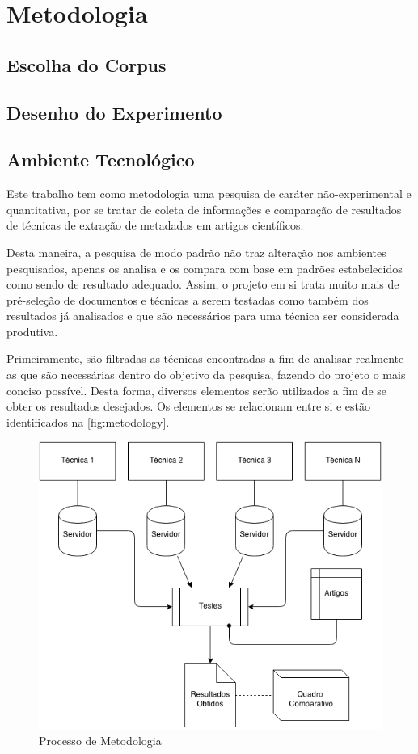 \chapter{Metodologia}

\section{Escolha do Corpus}

\section{Desenho do Experimento}

\section{Ambiente Tecnológico}

Este trabalho tem como metodologia uma pesquisa de caráter não-experimental e quantitativa, por se tratar de coleta de informações e comparação de resultados de técnicas de extração de metadados em artigos científicos.

Desta maneira, a pesquisa de modo padrão não traz alteração nos ambientes pesquisados, apenas os analisa e os compara com base em padrões estabelecidos como sendo de resultado adequado. Assim, o projeto em si trata muito mais de pré-seleção de documentos e técnicas a serem testadas como também dos resultados já analisados e que são necessários para uma técnica ser considerada produtiva.


Primeiramente, são filtradas as técnicas encontradas a fim de analisar realmente as que são necessárias dentro do objetivo da pesquisa, fazendo do projeto o mais conciso possível. Desta forma, diversos elementos serão utilizados a fim de se obter os resultados desejados. Os elementos se relacionam entre si e estão identificados na \autoref{fig:metodology}. 


\begin{figure}
\centering
\caption{Processo de Metodologia}
\label{fig:metodology}
\includegraphics[width=0.7\linewidth]{./assets/metodology}
\end{figure}


